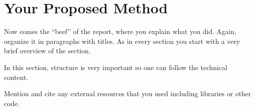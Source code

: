 \section{Your Proposed Method}
  \label{sec:yourmethod}

  Now comes the ``beef'' of the report, where you explain what you
  did. Again, organize it in paragraphs with titles. As in every section
  you start with a very brief overview of the section.

  In this section, structure is very important so one can follow the technical content.

  Mention and cite any external resources that you used including libraries or other code.

